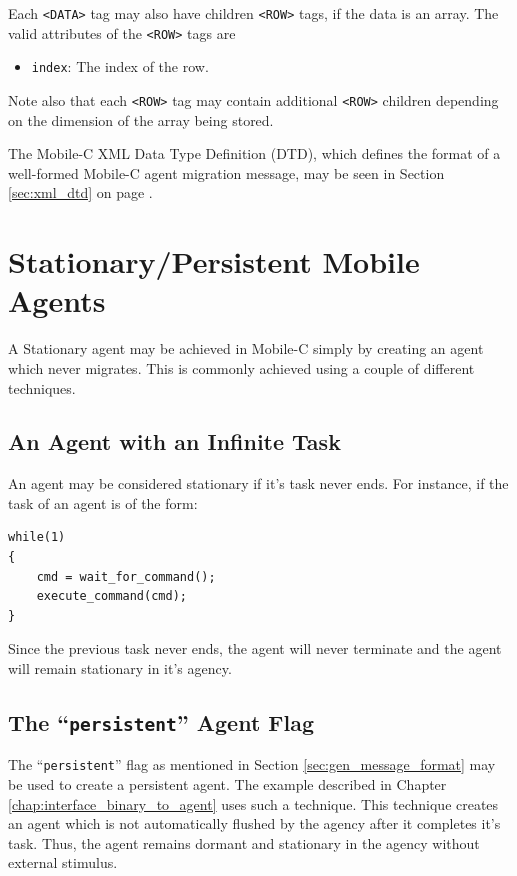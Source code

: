 \documentclass[11pt]{report}
\begin{document}
Each \texttt{<DATA>} tag may also have children \texttt{<ROW>} tags, if
the data is an array. The valid attributes of the \texttt{<ROW>} tags are
\begin{itemize}
\item \texttt{index}: The index of the row.
\end{itemize}
Note also that each \texttt{<ROW>} tag may contain additional \texttt{<ROW>}
children depending on the dimension of the array being stored.

The Mobile-C XML Data Type Definition (DTD), which defines the format of a
well-formed Mobile-C agent migration message, may be seen in Section
\ref{sec:xml_dtd} on page \pageref{sec:xml_dtd}.

\section{Stationary/Persistent Mobile Agents}
A Stationary agent may be achieved in Mobile-C simply by creating an agent which
never migrates. This is commonly achieved using a couple of different
techniques.
\subsection{An Agent with an Infinite Task}
An agent may be considered stationary if it's task never ends. For instance, if
the task of an agent is of the form:
\begin{verbatim}
while(1)
{
    cmd = wait_for_command();
    execute_command(cmd);
}
\end{verbatim}
Since the previous task never ends, the agent will never terminate and the agent
will remain stationary in it's agency. 

\subsection{The ``\texttt{persistent}'' Agent Flag}
The ``\texttt{persistent}'' flag as mentioned in Section
\ref{sec:gen_message_format} may be used to create a persistent agent. The
example described in Chapter \ref{chap:interface_binary_to_agent} uses such a
technique. This technique creates an agent which is not automatically flushed by the agency
after it completes it's task. Thus, the agent remains dormant and stationary in
the agency without external stimulus.
\end{document}
